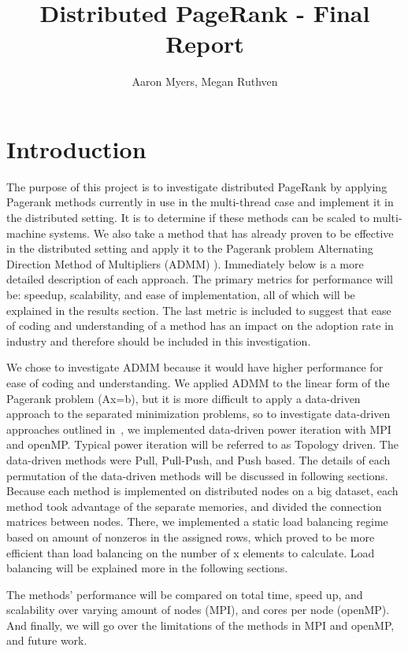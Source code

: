 \documentclass[letterpaper,11pt,onecolumn]{article}
\title{Distributed PageRank - Final Report}
\author{Aaron Myers, Megan Ruthven}
\begin{document}
\maketitle
\tableofcontents
\pagebreak
\section{Introduction}
The purpose of this project is to investigate distributed PageRank by applying Pagerank methods currently in use in the multi-thread case and implement it in the distributed setting. It is to determine if these methods can be scaled to multi-machine systems. We also take a method that has already proven to be effective in the distributed setting and apply it to the Pagerank problem Alternating Direction Method of Multipliers (ADMM) \cite{ADMM}). Immediately below is a more detailed description of each approach. The primary metrics for performance will be: speedup, scalability, and ease of implementation, all of which will be explained in the results section. The last metric is included to suggest that ease of coding and understanding of a method has an impact on the adoption rate in industry and therefore should be included in this investigation.

We chose to investigate ADMM \cite{ADMM} because it would have higher performance for ease of coding and understanding. We applied ADMM to the linear form of the Pagerank problem (Ax=b), but it is more difficult to apply a data-driven approach to the separated minimization problems, so to investigate data-driven approaches outlined in~\cite{Joyce}, we implemented data-driven power iteration with MPI and openMP. Typical power iteration will be referred to as Topology driven. The data-driven methods were Pull, Pull-Push, and Push based. The details of each permutation of the data-driven methods will be discussed in following sections. Because each method is implemented on distributed nodes on a big dataset, each method took advantage of the separate memories, and divided the connection matrices between nodes. There, we implemented a static load balancing regime based on amount of nonzeros in the assigned rows, which proved to be more efficient than load balancing on the number of x elements to calculate. Load balancing will be explained more in the following sections. 

The methods' performance will be compared on total time, speed up, and scalability over varying amount of nodes (MPI), and cores per node (openMP). And finally, we will go over the limitations of the methods in MPI and openMP, and future work. 
\end{document}
